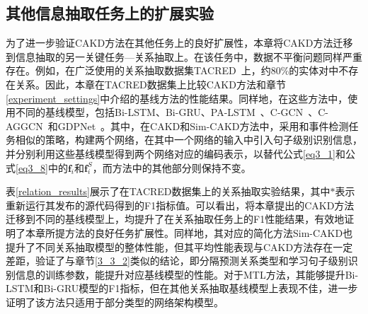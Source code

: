 \subsection{其他信息抽取任务上的扩展实验}

为了进一步验证CAKD方法在其他任务上的良好扩展性，本章将CAKD方法迁移到信息抽取的另一关键任务—关系抽取上。在该任务中，数据不平衡问题同样严重存在。例如，在广泛使用的关系抽取数据集TACRED~\cite{zhang2017position}上，约80\%的实体对中不存在关系。因此，本章在TACRED数据集上比较CAKD方法和章节\ref{experiment_settings}中介绍的基线方法的性能结果。同样地，在这些方法中，使用不同的基线模型，包括Bi-LSTM、Bi-GRU、PA-LSTM~\cite{zhang2017position}、C-GCN~\cite{zhang2018graph}、C-AGGCN~\cite{guo2019attention}和GDPNet~\cite{xue2021gdpnet}。其中，在CAKD和Sim-CAKD方法中，采用和事件检测任务相似的策略，构建两个网络，在其中一个网络的输入中引入句子级别识别信息，并分别利用这些基线模型得到两个网络对应的编码表示，以替代公式\ref{eq3_1}和公式\ref{eq3_8}中的$\boldsymbol{f}_i$和$\boldsymbol{f}_i^{S}$，而方法中的其他部分则保持不变。

表\ref{relation_results}展示了在TACRED数据集上的关系抽取实验结果，其中$*$表示重新运行其发布的源代码得到的F1指标值。可以看出，将本章提出的CAKD方法迁移到不同的基线模型上，均提升了在关系抽取任务上的F1性能结果，有效地证明了本章所提方法的良好任务扩展性。同样地，其对应的简化方法Sim-CAKD也提升了不同关系抽取模型的整体性能，但其平均性能表现与CAKD方法存在一定差距，验证了与章节\ref{3_3_2}类似的结论，即分隔预测关系类型和学习句子级别识别信息的训练参数，能提升对应基线模型的性能。对于MTL方法，其能够提升Bi-LSTM和Bi-GRU模型的F1指标，但在其他关系抽取基线模型上表现不佳，进一步证明了该方法只适用于部分类型的网络架构模型。

